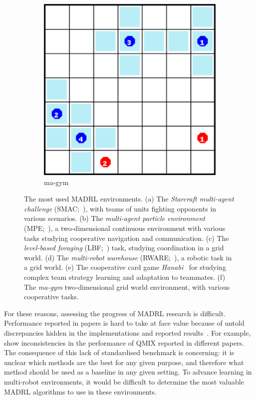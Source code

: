 \begin{figure}
\begin{subfigure}[c]{0.225\textwidth}
        \includegraphics[width=\textwidth]{Figures/MADRL/magym.png}
        \caption{ma-gym}
        \label{fig:magym}
    \end{subfigure}
    \caption{The most used MADRL environments. (a) The \textit{Starcraft multi-agent challenge} (SMAC;~\cite{Samvelyan2019_SMAC}), with teams of units fighting opponents in various scenarios. (b) The \textit{multi-agent particle environment} (MPE;~\cite{Lowe2017_MADDPG}), a two-dimensional continuous environment with various tasks studying cooperative navigation and communication. (c) The \textit{level-based foraging} (LBF;~\cite{Albrecht2013_Foraging}) task, studying coordination in a grid world. (d) The \textit{multi-robot warehouse} (RWARE;~\cite{Christianos2020_SharedExp}), a robotic task in a grid world. (e) The cooperative card game \textit{Hanabi}~\citep{Bard2020_Hanabi} for studying complex team strategy learning and adaptation to teammates. (f) The \textit{ma-gym} two-dimensional grid world environment, with various cooperative tasks.}
    \label{fig:madrlenvs}
\end{figure}

For these reasons, assessing the progress of MADRL research is difficult. Performance reported in papers is hard to take at face value because of untold discrepancies hidden in the implementations and reported results~\citep{Singh2023_EvalMARL}. For example, \cite{Gorsane2022_BenchmarkCoopMARL} show inconsistencies in the performance of QMIX reported in different papers. The consequence of this lack of standardised benchmark is concerning: it is unclear which methods are the best for any given purpose, and therefore what method should be used as a baseline in any given setting. To advance learning in multi-robot environments, it would be difficult to determine the most valuable MADRL algorithms to use in these environments. 

